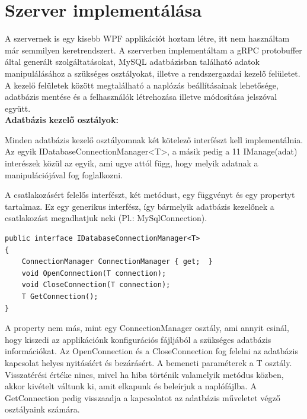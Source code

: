 \documentclass[
]{thesis-ekf}
\theoremstyle{definition}
\theoremstyle{remark}
\begin{document}
\section {Szerver implementálása}
A szervernek is egy kisebb WPF applikációt hoztam létre, itt nem használtam már semmilyen keretrendszert. A szerverben implementáltam a gRPC protobuffer által generált szolgáltatásokat, MySQL adatbázisban található adatok manipulálásához a szükséges osztályokat, illetve a rendszergazdai kezelő felületet.  A kezelő felületek között megtalálható a naplózás beállításainak lehetősége, adatbázis mentése és a felhasználók létrehozása illetve módosítása jelszóval együtt.\\
\textbf{Adatbázis kezelő osztályok:}

Minden adatbázis kezelő osztályomnak két kötelező interfészt kell implementálnia. Az egyik IDatabaseConnectionManager<T>, a másik pedig a 11 IManage(adat) interészek közül az egyik, ami ugye attól függ, hogy melyik adatnak a manipulációjával fog foglalkozni.

A csatlakozásért felelős interfészt, két metódust, egy függvényt és egy propertyt tartalmaz.
Ez egy generikus interfész, így bármelyik adatbázis kezelőnek a csatlakozást megadhatjuk neki (Pl.: MySqlConnection).
\begin{lstlisting}[caption={Kötelező interfész adatbázist kezelő osztályok számára.},captionpos=b]
public interface IDatabaseConnectionManager<T>
{     
	ConnectionManager ConnectionManager { get;  }
	void OpenConnection(T connection);
	void CloseConnection(T connection);
	T GetConnection();
}
\end{lstlisting}
A property nem más, mint egy ConnectionManager osztály, ami annyit csinál, hogy kiszedi az applikációnk konfigurációs fájljából a szükséges adatbázis információkat. Az OpenConnection és a CloseConnection fog felelni az adatbázis kapcsolat helyes nyitásáért és bezárásért. A bemeneti paraméterek a T osztály. Visszatérési értéke nincs, mivel ha hiba történik valamelyik metódus közben, akkor kivételt váltunk ki, amit elkapunk és beleírjuk a naplófájlba. A GetConnection pedig visszaadja a kapcsolatot az adatbázis műveletet végző osztályaink számára.
\end{document}
